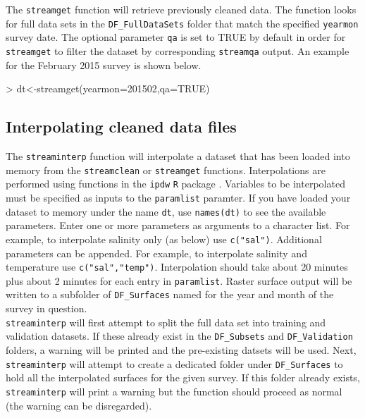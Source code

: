 \documentclass[12pt]{article}
\begin{document}
The \texttt{streamget} function will retrieve previously cleaned data. The function looks for full data sets in the \verb|DF_FullDataSets| folder that match the specified \texttt{yearmon} survey date. The optional parameter \texttt{qa} is set to TRUE by default in order for \texttt{streamget} to filter the dataset by corresponding \texttt{streamqa} output. An example for the February 2015 survey is shown below.

\begin{Schunk}
\begin{Sinput}
> dt<-streamget(yearmon=201502,qa=TRUE)
\end{Sinput}
\end{Schunk}

\subsection{Interpolating cleaned data files}

The \texttt{streaminterp} function will interpolate a dataset that has been loaded into memory from the \texttt{streamclean} or \texttt{streamget} functions. Interpolations are performed using functions in the \texttt{ipdw} \texttt{R} package \citep{ipdw}. Variables to be interpolated must be specified as inputs to the \texttt{paramlist} paramter. If you have loaded your dataset to memory under the name \texttt{dt}, use \texttt{names(dt)} to see the available parameters. Enter one or more parameters as arguments to a character list. For example, to interpolate salinity only (as below) use \texttt{c("sal")}. Additional parameters can be appended. For example, to interpolate salinity and temperature use \texttt{c("sal","temp")}. Interpolation should take about 20 minutes plus about 2 minutes for each entry in \texttt{paramlist}. Raster surface output will be written to a subfolder of \verb|DF_Surfaces| named for the year and month of the survey in question.\\

\texttt{streaminterp} will first attempt to split the full data set into training and validation datasets. If these already exist in the \verb|DF_Subsets| and \verb|DF_Validation| folders, a warning will be printed and the pre-existing datsets will be used. Next, \texttt{streaminterp} will attempt to create a dedicated folder under \verb|DF_Surfaces| to hold all the interpolated surfaces for the given survey. If this folder already exists, \texttt{streaminterp} will print a warning but the function should proceed as normal (the warning can be disregarded).\\
\end{document}
